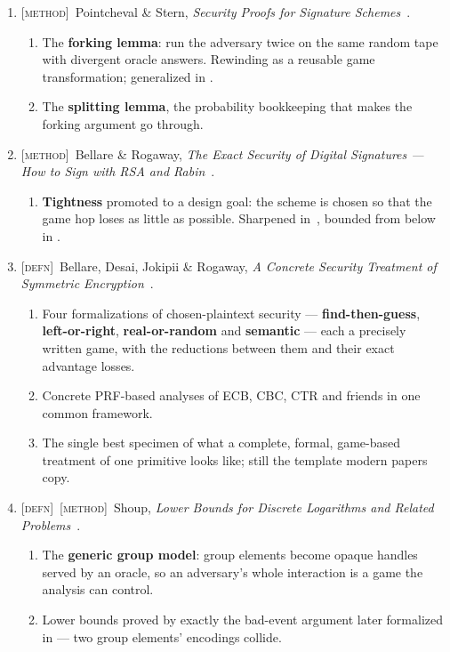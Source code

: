 \documentclass[11pt]{article}
\newcommand{\kind}[1]{{\footnotesize\textsc{\textcolor{yearcolor}{[#1]}}}\ }
\newcommand{\defn}{\kind{defn}}
\newcommand{\method}{\kind{method}}
\newcommand{\paper}[3]{#1, \emph{#2}~\cite{#3}.}
\begin{document}
\begin{enumerate}
  \item \method \paper{Pointcheval \& Stern}{Security Proofs for Signature
    Schemes}{PS96}
    \begin{enumerate}
      \item The \textbf{forking lemma}: run the adversary twice on the same
        random tape with divergent oracle answers. Rewinding as a reusable game
        transformation; generalized in \cite{BN06}.
      \item The \textbf{splitting lemma}, the probability bookkeeping that makes
        the forking argument go through.
    \end{enumerate}

  \item \method \paper{Bellare \& Rogaway}{The Exact Security of Digital
    Signatures --- How to Sign with RSA and Rabin}{BR96}
    \begin{enumerate}
      \item \textbf{Tightness} promoted to a design goal: the scheme is chosen
        so that the game hop loses as little as possible. Sharpened
        in~\cite{Cor00}, bounded from below in \cite{BJLS16}.
    \end{enumerate}

  \item \defn \paper{Bellare, Desai, Jokipii \& Rogaway}{A Concrete Security
    Treatment of Symmetric Encryption}{BDJR97}
    \begin{enumerate}
      \item Four formalizations of chosen-plaintext security ---
        \textbf{find-then-guess}, \textbf{left-or-right},
        \textbf{real-or-random} and \textbf{semantic} --- each a precisely
        written game, with the reductions between them and their exact advantage
        losses.
      \item Concrete PRF-based analyses of ECB, CBC, CTR and friends in one
        common framework.
      \item The single best specimen of what a complete, formal, game-based
        treatment of one primitive looks like; still the template modern papers
        copy.
    \end{enumerate}

  \item \defn\method \paper{Shoup}{Lower Bounds for Discrete Logarithms and
    Related Problems}{Shou97}
    \begin{enumerate}
      \item The \textbf{generic group model}: group elements become opaque
        handles served by an oracle, so an adversary's whole interaction is a
        game the analysis can control.
      \item Lower bounds proved by exactly the bad-event argument later
        formalized in \cite{BR04} --- two group elements' encodings collide.
    \end{enumerate}
\end{enumerate}
\end{document}
